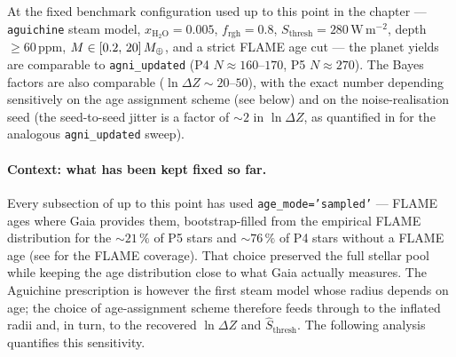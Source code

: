 At the fixed benchmark configuration used up to this point in the
chapter --- \texttt{aguichine} steam model, $x_{\mathrm{H_2O}}=0.005$,
$f_\mathrm{rgh}=0.8$, $S_\mathrm{thresh}=280\,\mathrm{W\,m^{-2}}$,
depth $\geq 60\,\mathrm{ppm}$, $M \in [0.2,\,20]\,M_{\oplus}$, and a
strict FLAME age cut --- the planet yields are comparable to
\texttt{agni\_updated} (P4 $N \approx 160$--$170$, P5 $N \approx 270$).
The Bayes factors are also comparable
($\ln\Delta Z \sim 20$--$50$), with the exact number depending
sensitively on the age assignment scheme (see below) and on the
noise-realisation seed
(the seed-to-seed jitter is a factor of ${\sim}2$ in $\ln\Delta Z$,
as quantified in  for the analogous
\texttt{agni\_updated} sweep).

\paragraph{Context: what has been kept fixed so far.}
Every subsection of  up to this point has used
\texttt{age\_mode='sampled'} --- FLAME ages where Gaia provides them,
bootstrap-filled from the empirical FLAME distribution for the
$\sim 21\,\%$ of P5 stars and $\sim 76\,\%$ of P4 stars without a
FLAME age (see  for the FLAME coverage).
That choice preserved the full stellar pool while keeping the age
distribution close to what Gaia actually measures.  The Aguichine
prescription is however the first steam model whose radius depends
on age; the choice of age-assignment scheme therefore feeds through
to the inflated radii and, in turn, to the recovered $\ln\Delta Z$
and $\hat{S}_\mathrm{thresh}$.  The following analysis quantifies
this sensitivity.


